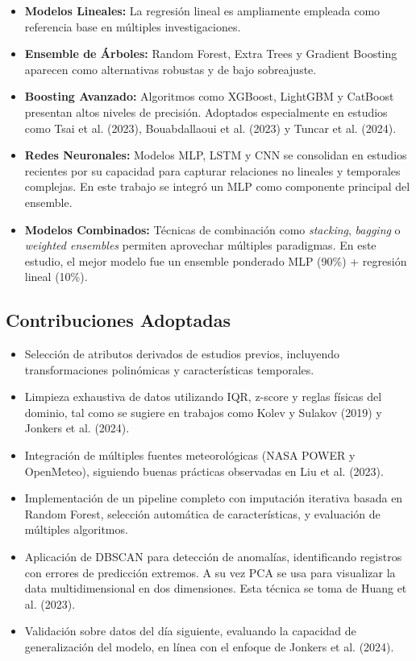 \documentclass[conference]{IEEEtran}
\begin{document}
\begin{itemize}
	\item \textbf{Modelos Lineales:} La regresión lineal es ampliamente empleada como referencia base en múltiples investigaciones.
	
	\item \textbf{Ensemble de Árboles:} Random Forest, Extra Trees y Gradient Boosting aparecen como alternativas robustas y de bajo sobreajuste.
	
	\item \textbf{Boosting Avanzado:} Algoritmos como XGBoost, LightGBM y CatBoost presentan altos niveles de precisión. Adoptados especialmente en estudios como Tsai et al. (2023), Bouabdallaoui et al. (2023) y Tuncar et al. (2024).
	
	\item \textbf{Redes Neuronales:} Modelos MLP, LSTM y CNN se consolidan en estudios recientes por su capacidad para capturar relaciones no lineales y temporales complejas. En este trabajo se integró un MLP como componente principal del ensemble.
	
	\item \textbf{Modelos Combinados:} Técnicas de combinación como \textit{stacking}, \textit{bagging} o \textit{weighted ensembles} permiten aprovechar múltiples paradigmas. En este estudio, el mejor modelo fue un ensemble ponderado MLP (90\%) + regresión lineal (10\%).
\end{itemize}

\subsection{Contribuciones Adoptadas}

\begin{itemize}
	\item Selección de atributos derivados de estudios previos, incluyendo transformaciones polinómicas y características temporales.
	
	\item Limpieza exhaustiva de datos utilizando IQR, z-score y reglas físicas del dominio, tal como se sugiere en trabajos como Kolev y Sulakov (2019) y Jonkers et al. (2024).
	
	\item Integración de múltiples fuentes meteorológicas (NASA POWER y OpenMeteo), siguiendo buenas prácticas observadas en Liu et al. (2023).
	
	\item Implementación de un pipeline completo con imputación iterativa basada en Random Forest, selección automática de características, y evaluación de múltiples algoritmos.
	
	\item Aplicación de DBSCAN para detección de anomalías, identificando registros con errores de predicción extremos. A su vez PCA se usa  para visualizar la data multidimensional en dos dimensiones. Esta técnica se toma de Huang et al. (2023).
	
	\item Validación sobre datos del día siguiente, evaluando la capacidad de generalización del modelo, en línea con el enfoque de Jonkers et al. (2024).
\end{itemize}
\end{document}
